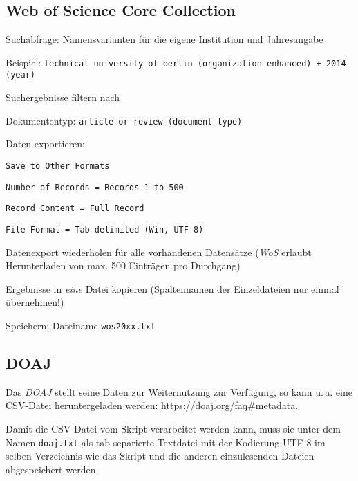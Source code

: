 \subsection*{Web of Science Core Collection}
\begin{compactitem}
\item Suchabfrage: Namensvarianten für die eigene Institution und Jahresangabe 
	\begin{compactitem}
    \item Beispiel: \texttt{technical university of berlin (organization enhanced) + 2014 (year)}
    \end{compactitem}
\item Suchergebnisse filtern nach
	\begin{compactitem}
    \item Dokumententyp: \texttt{article or review (document type)}
    \end{compactitem}
\item Daten exportieren: 
	\begin{compactitem}
	\item \texttt{Save to Other Formats}
    \item \texttt{Number of Records = Records 1 to 500}
    \item \texttt{Record Content = Full Record}
    \item \texttt{File Format = Tab-delimited (Win, UTF-8)}
	\end{compactitem}
\item Datenexport wiederholen für alle vorhandenen Datensätze (\textit{WoS} erlaubt Herunterladen von max. 500 Einträgen pro Durchgang)
\item Ergebnisse in \textit{eine} Datei kopieren (Spaltennamen der Einzeldateien nur einmal übernehmen!)
\item Speichern: Dateiname \texttt{wos20xx.txt}
\end{compactitem}

\subsection*{DOAJ} 
\label{doaj}

Das \textit{DOAJ} stellt seine Daten zur Weiternutzung zur Verfügung, so kann u.\,a. eine CSV-Datei heruntergeladen werden: \url{https://doaj.org/faq#metadata}. 

Damit die CSV-Datei vom Skript verarbeitet werden kann, muss sie unter dem Namen \texttt{doaj.txt} als tab-separierte Textdatei mit der Kodierung UTF-8 im selben Verzeichnis wie das Skript und die anderen einzulesenden Dateien abgespeichert werden.